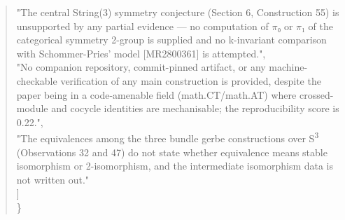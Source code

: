 \documentclass[11pt]{article}
\begin{document}
\begin{quote}
    "The central String(3) symmetry conjecture (Section 6, Construction 55) is unsupported by any partial evidence --- no computation of \ensuremath{\pi}₀ or \ensuremath{\pi}₁ of the categorical symmetry 2-group is supplied and no k-invariant comparison with Schommer-Pries' model [MR2800361] is attempted.",\\
    "No companion repository, commit-pinned artifact, or any machine-checkable verification of any main construction is provided, despite the paper being in a code-amenable field (math.CT/math.AT) where crossed-module and cocycle identities are mechanisable; the reproducibility score is 0.22.",\\
    "The equivalences among the three bundle gerbe constructions over S\textsuperscript{3} (Observations 32 and 47) do not state whether equivalence means stable isomorphism or 2-isomorphism, and the intermediate isomorphism data is not written out."\\
  ]\\
\}\\
\end{quote}
\end{document}
